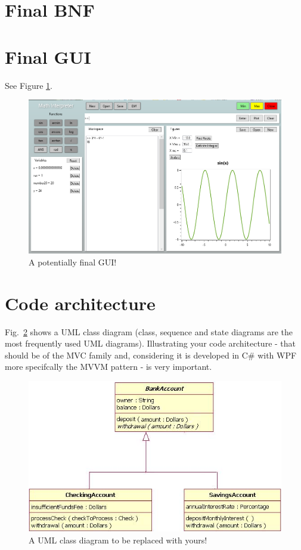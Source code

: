 \documentclass[a4paper, oneside, 11pt]{report}
\begin{document}
\section{Final BNF}

\section{Final GUI}

See Figure \ref{gui02}.

\begin{figure}[htb]
\includegraphics[width=0.9 \columnwidth]{GUI_02.png}
\caption{A potentially final GUI!}
\label{gui02}
\end{figure}

\section{Code architecture}

Fig.\ \ref{class} shows a UML class diagram (class, sequence and state diagrams are the most frequently used UML diagrams). Illustrating your code architecture - that should be of the MVC family and, considering it is developed in C\# with WPF more specifcally the MVVM pattern - is very important.

\begin{figure}[htb]
\includegraphics[width=1.0 \columnwidth]{class.png}
\caption{A UML class diagram to be replaced with yours!}
\label{class}
\end{figure}
\end{document}
